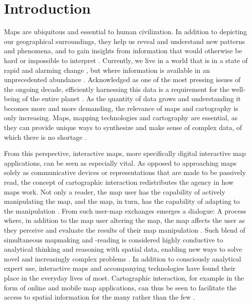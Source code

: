 \section{Introduction}



Maps are ubiquitous and essential to human civilization.
In addition to depicting our geographical surroundings,
they help us reveal and understand new patterns and phenomena,
and to gain insights from information
that would otherwise be hard or impossible to interpret \parencite{mac2004}.
Currently, we live in a world that is in a state of rapid and
alarming change \parencite{un2023},
but where information is available in an unprecedented abundance
\parencite{rob2017a, un2023}.
Acknowledged as one of the most pressing issues of the ongoing decade,
efficiently harnessing this data is a requirement
for the well-being of the entire planet \parencite{un2020}.
As the quantity of data grows
and understanding it becomes more and more demanding,
the relevance of maps and cartography is only increasing.
Maps, mapping technologies and cartography are essential,
as they can provide unique ways to synthesize and make sense of complex data,
of which there is no shortage \parencite{kra2021}.

From this perspective,
interactive maps, more specifically digital interactive map applications,
can be seen as especially vital.
As opposed to approaching maps solely as communicative devices or representations
that are made to be passively read,
the concept of cartographic interaction redistributes the agency in how maps work.
Not only a reader, the map user has the capability of actively manipulating the map,
and the map, in turn, has the capability of adapting to the manipulation \parencite{eds2008}.
From such user-map exchanges emerges a dialogue:
A process where, in addition to the map user altering the map,
the map affects the user as they perceive and evaluate the results of their map manipulation
\parencite{rot2011}.
Such blend of simultaneous mapmaking and -reading
is considered highly conductive to analytical thinking and reasoning
with spatial data,
enabling new ways to solve novel and increasingly complex problems
\parencite{rob2017b, and2010}.
In addition to consciously analytical expert use,
interactive maps and accompanying technologies have found their place
in the everyday lives of most.
Cartographic interaction, for example in the form of online and mobile map applications,
can thus be seen to facilitate the access to spatial information
for the many rather than the few \parencite{mei2019}.

